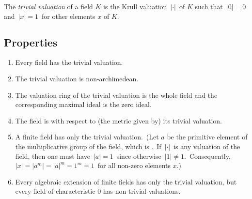 \documentclass[12pt]{article}
\begin{document}
The {\em trivial valuation} of a field $K$ is the Krull valuation\, $|\cdot|$\, of $K$ such that\, $|0| = 0$\, and\, $|x| = 1$\, for other elements $x$ of $K$.

\subsection*{Properties}

\begin{enumerate}
 \item Every field has the trivial valuation.
 \item The trivial valuation is non-archimedean.
 \item The valuation ring of the trivial valuation is the whole field and the corresponding maximal ideal is the zero ideal.
 \item The field is  with respect to (the metric given by) its trivial valuation.
 \item A finite field has only the trivial valuation.\, (Let $a$ be the primitive element of the multiplicative group of the field, which is .\, If \,$|\cdot|$\, is any valuation of the field, then one must have\, $|a| = 1$\, since otherwise\, $|1| \neq 1$.\, Consequently,\, $|x| = |a^m| = |a|^m = 1^m = 1$\, for all non-zero elements $x$.)
 \item Every algebraic extension of finite fields has only the trivial valuation, but every field of characteristic 0 has non-trivial valuations.
\end{enumerate}
\end{document}
